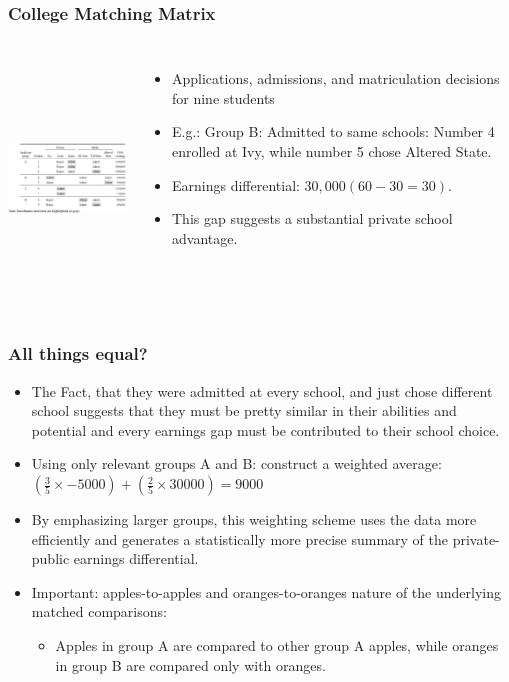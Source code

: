 \documentclass{beamer}
\begin{document}
\begin{frame}
\frametitle{College Matching Matrix}
\begin{columns}
\includegraphics[width=6cm,height=6.5cm,keepaspectratio]{Regression 1} 

\begin{itemize}
	\item Applications, admissions, and matriculation decisions for nine students
	\item E.g.: Group B: Admitted to same schools: Number 4 enrolled at Ivy, while number 5 chose Altered State.
	\item Earnings differential: $30,000 (60 - 30 = 30)$. 
	\item This gap suggests a substantial private school advantage.
\end{itemize}

\end{columns}
\end{frame}

\begin{frame}
\frametitle{All things equal?}
\begin{itemize}
	\item The Fact, that they were admitted at every school, and just chose different school suggests that they must be pretty similar in their abilities and potential and every earnings gap must be contributed to their school choice.
	\item Using only relevant groups A and B: construct a weighted average: $(\frac{3}{5}\times-5000)+(\frac{2}{5}\times30000)=9000$
	\item By emphasizing larger groups, this weighting scheme uses the data more efficiently and generates a statistically more precise summary of the private-public earnings differential.
	\item Important: apples-to-apples and oranges-to-oranges nature of the underlying matched comparisons: 
		\begin{itemize}
			\item[\rightarrow] Apples in group A are compared to other group A apples, while oranges in group B are compared only with oranges.
		\end{itemize}
\end{itemize}
\end{frame}
\end{document}
